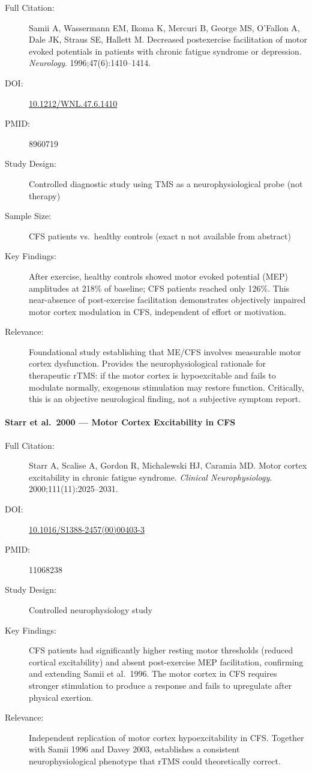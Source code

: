 \begin{description}
    \item[Full Citation:] Samii A, Wassermann EM, Ikoma K, Mercuri B, George MS, O'Fallon A, Dale JK, Straus SE, Hallett M\@. Decreased postexercise facilitation of motor evoked potentials in patients with chronic fatigue syndrome or depression. \textit{Neurology}. 1996;47(6):1410--1414.
    \item[DOI:] \href{https://doi.org/10.1212/WNL.47.6.1410}{10.1212/WNL.47.6.1410}
    \item[PMID:] 8960719
    \item[Study Design:] Controlled diagnostic study using TMS as a neurophysiological probe (not therapy)
    \item[Sample Size:] CFS patients vs.\ healthy controls (exact n not available from abstract)
    \item[Key Findings:] After exercise, healthy controls showed motor evoked potential (MEP) amplitudes at 218\% of baseline; CFS patients reached only 126\%. This near-absence of post-exercise facilitation demonstrates objectively impaired motor cortex modulation in CFS, independent of effort or motivation.
    \item[Relevance:] Foundational study establishing that ME/CFS involves measurable motor cortex dysfunction. Provides the neurophysiological rationale for therapeutic rTMS: if the motor cortex is hypoexcitable and fails to modulate normally, exogenous stimulation may restore function. Critically, this is an objective neurological finding, not a subjective symptom report.
\end{description}

\paragraph{Starr et al.\ 2000 --- Motor Cortex Excitability in CFS}

\begin{description}
    \item[Full Citation:] Starr A, Scalise A, Gordon R, Michalewski HJ, Caramia MD\@. Motor cortex excitability in chronic fatigue syndrome. \textit{Clinical Neurophysiology}. 2000;111(11):2025--2031.
    \item[DOI:] \href{https://doi.org/10.1016/S1388-2457(00)00403-3}{10.1016/S1388-2457(00)00403-3}
    \item[PMID:] 11068238
    \item[Study Design:] Controlled neurophysiology study
    \item[Key Findings:] CFS patients had significantly higher resting motor thresholds (reduced cortical excitability) and absent post-exercise MEP facilitation, confirming and extending Samii et al.\ 1996. The motor cortex in CFS requires stronger stimulation to produce a response and fails to upregulate after physical exertion.
    \item[Relevance:] Independent replication of motor cortex hypoexcitability in CFS. Together with Samii 1996 and Davey 2003, establishes a consistent neurophysiological phenotype that rTMS could theoretically correct.
\end{description}

